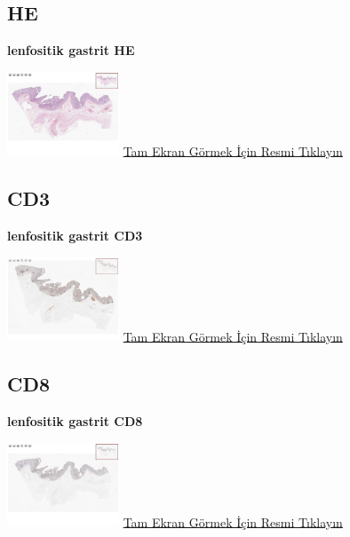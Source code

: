 \documentclass[
  letterpaper,
  DIV=11,
  numbers=noendperiod]{scrreprt}
\begin{document}
\hypertarget{he-8}{%
\subsection{HE}\label{he-8}}

\textbf{lenfositik gastrit HE}

\href{https://images.patolojiatlasi.com/lymphocytic-gastritis/HE.html}{\includegraphics[width=0.25\textwidth,height=\textheight]{./screenshots/thumbnail_lymphocytic-gastritisHE.png}}
\href{https://images.patolojiatlasi.com/lymphocytic-gastritis/HE.html}{Tam
Ekran Görmek İçin Resmi Tıklayın}

\hypertarget{cd3}{%
\subsection{CD3}\label{cd3}}

\textbf{lenfositik gastrit CD3}

\href{https://images.patolojiatlasi.com/lymphocytic-gastritis/CD3.html}{\includegraphics[width=0.25\textwidth,height=\textheight]{./screenshots/thumbnail_lymphocytic-gastritisCD3.png}}
\href{https://images.patolojiatlasi.com/lymphocytic-gastritis/CD3.html}{Tam
Ekran Görmek İçin Resmi Tıklayın}

\hypertarget{cd8}{%
\subsection{CD8}\label{cd8}}

\textbf{lenfositik gastrit CD8}

\href{https://images.patolojiatlasi.com/lymphocytic-gastritis/CD8.html}{\includegraphics[width=0.25\textwidth,height=\textheight]{./screenshots/thumbnail_lymphocytic-gastritisCD8.png}}
\href{https://images.patolojiatlasi.com/lymphocytic-gastritis/CD8.html}{Tam
Ekran Görmek İçin Resmi Tıklayın}
\end{document}
